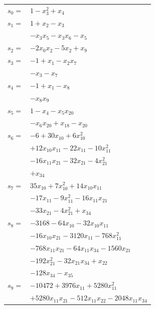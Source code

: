 \begingroup
\small
\setlength{\tabcolsep}{2pt}
\setlength{\LTleft}{0pt}
\begin{longtable}{@{}r@{\;}l@{}}
\(s_{0}=\) & \(\displaystyle 1 -x_{3}^{2} +x_{4}\) \\[3pt]
\(s_{1}=\) & \(\displaystyle 1 +x_{2} -x_{3}\) \\
 & \(\displaystyle -x_{3}x_{5} -x_{3}x_{6} -x_{5}\) \\[3pt]
\(s_{2}=\) & \(\displaystyle -2x_{0}x_{2} -5x_{2} +x_{9}\) \\[3pt]
\(s_{3}=\) & \(\displaystyle -1 +x_{1} -x_{2}x_{7}\) \\
 & \(\displaystyle -x_{3} -x_{7}\) \\[3pt]
\(s_{4}=\) & \(\displaystyle -1 +x_{1} -x_{8}\) \\
 & \(\displaystyle -x_{8}x_{9}\) \\[3pt]
\(s_{5}=\) & \(\displaystyle 1 -x_{4} -x_{5}x_{20}\) \\
 & \(\displaystyle -x_{6}x_{20} +x_{18} -x_{20}\) \\[3pt]
\(s_{6}=\) & \(\displaystyle -6 +30x_{10} +6x_{10}^{2}\) \\
 & \(\displaystyle +12x_{10}x_{11} -22x_{11} -10x_{11}^{2}\) \\
 & \(\displaystyle -16x_{11}x_{21} -32x_{21} -4x_{21}^{2}\) \\
 & \(\displaystyle +x_{34}\) \\[3pt]
\(s_{7}=\) & \(\displaystyle 35x_{10} +7x_{10}^{2} +14x_{10}x_{11}\) \\
 & \(\displaystyle -17x_{11} -9x_{11}^{2} -16x_{11}x_{21}\) \\
 & \(\displaystyle -33x_{21} -4x_{21}^{2} +x_{34}\) \\[3pt]
\(s_{8}=\) & \(\displaystyle -3168 -64x_{10} -32x_{10}x_{11}\) \\
 & \(\displaystyle -16x_{10}x_{21} -3120x_{11} -768x_{11}^{2}\) \\
 & \(\displaystyle -768x_{11}x_{21} -64x_{11}x_{34} -1560x_{21}\) \\
 & \(\displaystyle -192x_{21}^{2} -32x_{21}x_{34} +x_{22}\) \\
 & \(\displaystyle -128x_{34} -x_{35}\) \\[3pt]
\(s_{9}=\) & \(\displaystyle -10472 +3976x_{11} +5280x_{11}^{2}\) \\
 & \(\displaystyle +5280x_{11}x_{21} -512x_{11}x_{22} -2048x_{11}x_{34}\) \\

\end{longtable}
